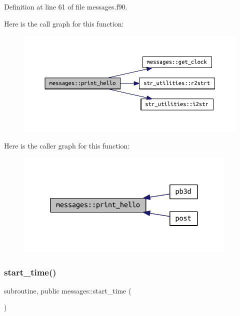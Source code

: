 Definition at line 61 of file messages.\+f90.

Here is the call graph for this function\+:\nopagebreak
\begin{figure}[H]
\begin{center}
\leavevmode
\includegraphics[width=350pt]{namespacemessages_a60c95b4c352b0087f32ef87279da49ca_cgraph}
\end{center}
\end{figure}
Here is the caller graph for this function\+:\nopagebreak
\begin{figure}[H]
\begin{center}
\leavevmode
\includegraphics[width=300pt]{namespacemessages_a60c95b4c352b0087f32ef87279da49ca_icgraph}
\end{center}
\end{figure}
\mbox{\label{namespacemessages_a84d5988f3ea5ca8dc2834032f896ae90}} 
\subsubsection{\texorpdfstring{start\+\_\+time()}{start\_time()}}
{\footnotesize\ttfamily subroutine, public messages\+::start\+\_\+time (\begin{DoxyParamCaption}{ }\end{DoxyParamCaption})}



